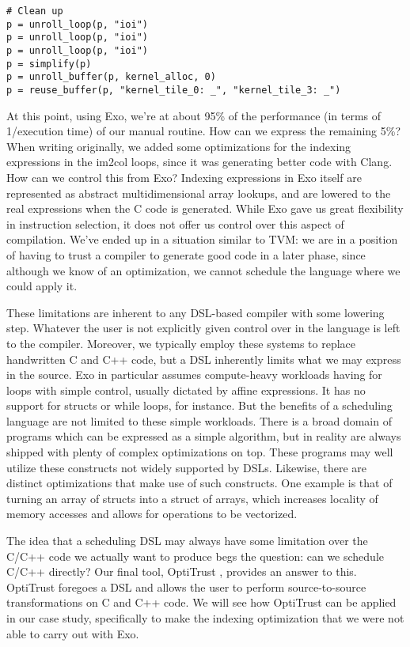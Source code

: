 \documentclass[acmsmall, nonacm=true]{acmart}
\begin{document}
\begin{verbatim}
# Clean up
p = unroll_loop(p, "ioi")
p = unroll_loop(p, "ioi")
p = unroll_loop(p, "ioi")
p = simplify(p)
p = unroll_buffer(p, kernel_alloc, 0)
p = reuse_buffer(p, "kernel_tile_0: _", "kernel_tile_3: _")
\end{verbatim}

At this point, using Exo, we're at about 95\% of the performance (in terms of 1/execution time) of our manual routine. How can we express the remaining 5\%? When writing originally, we added some optimizations for the indexing expressions in the im2col loops, since it was generating better code with Clang. How can we control this from Exo? Indexing expressions in Exo itself are represented as abstract multidimensional array lookups, and are lowered to the real expressions when the C code is generated. While Exo gave us great flexibility in instruction selection, it does not offer us control over this aspect of compilation. We've ended up in a situation similar to TVM: we are in a position of having to trust a compiler to generate good code in a later phase, since although we know of an optimization, we cannot schedule the language where we could apply it. 

These limitations are inherent to any DSL-based compiler with some lowering step. Whatever the user is not explicitly given control over in the language is left to the compiler. Moreover, we typically employ these systems to replace handwritten C and C++ code, but a DSL inherently limits what we may express in the source. Exo in particular assumes compute-heavy workloads having for loops with simple control, usually dictated by affine expressions. It has no support for structs or while loops, for instance.  But the benefits of a scheduling language are not limited to these simple workloads. There is a broad domain of programs which can be expressed as a simple algorithm, but in reality are always shipped with plenty of complex optimizations on top. These programs may well utilize these constructs not widely supported by DSLs. Likewise, there are distinct optimizations that make use of such constructs. One example is that of turning an array of structs into a struct of arrays, which increases locality of memory accesses and allows for operations to be vectorized. 

The idea that a scheduling DSL may always have some limitation over the C/C++ code we actually want to produce begs the question: can we schedule C/C++ directly? Our final tool, OptiTrust \cite{chargueraud:hal-03773485}, provides an answer to this. OptiTrust foregoes a DSL and allows the user to perform source-to-source transformations on C and C++ code. We will see how OptiTrust can be applied in our case study, specifically to make the indexing optimization that we were not able to carry out with Exo.
\end{document}
